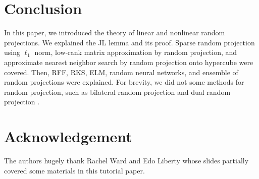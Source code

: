 \documentclass{article}
\begin{document}
\section{Conclusion}\label{section_conclusion}

In this paper, we introduced the theory of linear and nonlinear random projections. We explained the JL lemma and its proof. Sparse random projection using $\ell_1$ norm, low-rank matrix approximation by random projection, and approximate nearest neighbor search by random projection onto hypercube were covered. Then, RFF, RKS, ELM, random neural networks, and ensemble of random projections were explained. 
For brevity, we did not some methods for random projection, such as bilateral random projection \cite{zhou2012bilateral} and dual random projection \cite{zhang2013recovering}. 

\section*{Acknowledgement}

The authors hugely thank Rachel Ward and Edo Liberty whose slides \cite{ward2014dimension,liberty2006random} partially covered some materials in this tutorial paper.  







\end{document}
